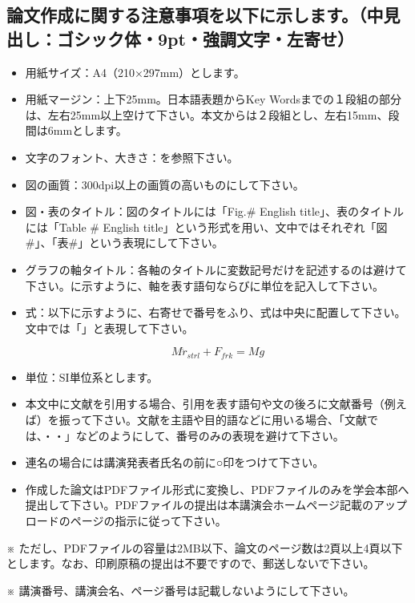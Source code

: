 \documentclass{jarticle}
\begin{document}
\subsection{論文作成に関する注意事項を以下に示します。（中見出し：ゴシック体・9pt・強調文字・左寄せ）}%
\begin{itemize}
	\item 用紙サイズ：A4（210×297mm）とします。
	\item 用紙マージン：上下25mm。日本語表題からKey Wordsまでの１段組の部分は、左右25mm以上空けて下さい。本文からは２段組とし、左右15mm、段間は6mmとします。
	\item 文字のフォント、大きさ：を参照下さい。
	\item 図の画質：300dpi以上の画質の高いものにして下さい。
	\item 図・表のタイトル：図のタイトルには「Fig.\# English title」、表のタイトルには「Table \# English title」という形式を用い、文中ではそれぞれ「図\#」、「表\#」という表現にして下さい。
	\item グラフの軸タイトル：各軸のタイトルに変数記号だけを記述するのは避けて下さい。に示すように、軸を表す語句ならびに単位を記入して下さい。
	\item 式：以下に示すように、右寄せで番号をふり、式は中央に配置して下さい。文中では「」と表現して下さい。
	
	\begin{equation}
		M\ddot{r}_{strl} + F_{frk} = Mg
		\label{eqn: eq1}
	\end{equation}

	\item 単位：SI単位系とします。
	\item 本文中に文献を引用する場合、引用を表す語句や文の後ろに文献番号（例えば\cite{Shinjuku98}）を振って下さい。文献を主語や目的語などに用いる場合、「文献\cite{Shinjuku98}では、・・」などのようにして、番号のみの表現を避けて下さい。
	\item 連名の場合には講演発表者氏名の前に○印をつけて下さい。
	\item 作成した論文はPDFファイル形式に変換し、PDFファイルのみを学会本部へ提出して下さい。PDFファイルの提出は本講演会ホームページ記載のアップロードのページの指示に従って下さい。
\end{itemize}

※ ただし、PDFファイルの容量は2MB以下、論文のページ数は2頁以上4頁以下とします。なお、印刷原稿の提出は不要ですので、郵送しないで下さい。

※ 講演番号、講演会名、ページ番号は記載しないようにして下さい。
\end{document}
